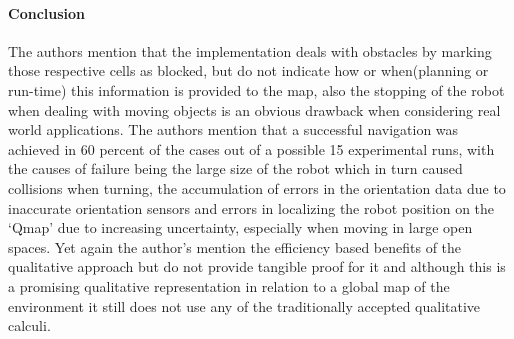 \begin{itemize}
	\paragraph{Conclusion}The authors mention that the implementation deals with obstacles by marking those respective cells as blocked, but do not indicate how or when(planning or run-time) this information is provided to the map, also the stopping of the robot when dealing with moving objects is an obvious drawback when considering real world applications. The authors mention that a successful navigation was achieved in 60 percent of the cases out of a possible 15 experimental runs, with the causes of failure being the large size of the robot which in turn caused collisions when turning, the accumulation of errors in the orientation data due to inaccurate orientation sensors and errors in localizing the robot position on the `Qmap' due to increasing uncertainty, especially when moving in large open spaces. Yet again the author's mention the efficiency based benefits of the qualitative approach but do not provide tangible proof for it and although this is a promising qualitative representation in relation to a global map of the environment it still does not use any of the traditionally accepted qualitative calculi.
	

\end{itemize}
